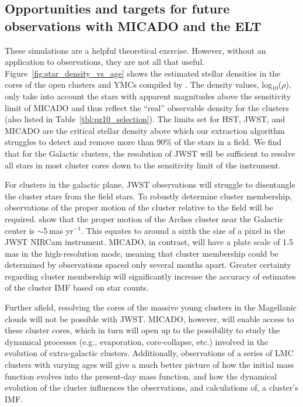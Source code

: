 \documentclass{aa}
\newcommand{\s}{$\sim$}
\newcommand{\h}[1]{$^{#1}$}
\begin{document}
\subsection{Opportunities and targets for future observations with MICADO and the ELT}
  \label{subsec:future_opportunities}

These simulations are a helpful theoretical exercise.
However, without an application to observations, they are not all that useful.
Figure~\ref{fig:star_density_vs_age} shows the estimated stellar densities in the cores of the open clusters and YMCs compiled by \citet{portegies2010}.
The density values, log$_{10}$($\rho$), only take into account the stars with apparent magnitudes above the sensitivity limit of MICADO and thus reflect the ``real'' observable density for the clusters (also listed in Table~\ref{tbl:pz10_selection}).
The limits set for HST, JWST, and MICADO are the critical stellar density above which our extraction algorithm struggles to detect and remove more than 90\% of the stars in a field.
We find that for the Galactic clusters, the resolution of JWST will be sufficient to resolve all stars in most cluster cores down to the sensitivity limit of the instrument.

For clusters in the galactic plane, JWST observations will struggle to disentangle the cluster stars from the field stars.
To robustly determine cluster membership, observations of the proper motion of the cluster relative to the field will be required.
\citet{stolte2008} show that the proper motion of the Arches cluster near the Galactic center is \s5\,mas yr\h{-1}.
This equates to around a sixth the size of a pixel in the JWST NIRCam instrument.
MICADO, in contrast, will have a plate scale of 1.5\,mas in the high-resolution mode, meaning that cluster membership could be determined by observations spaced only several months apart.
Greater certainty regarding cluster membership will significantly increase the accuracy of estimates of the cluster IMF based on star counts.

Further afield, resolving the cores of the massive young clusters in the Magellanic clouds will not be possible with JWST. MICADO, however, will enable access to these cluster cores, which in turn will open up to the possibility to study the dynamical processes (e.g., evaporation, core-collapse, etc.) involved in the evolution of extra-galactic clusters.
Additionally, observations of a series of LMC clusters with varying ages will give a much better picture of how the initial mass function evolves into the present-day mass function, and how the dynamical evolution of the cluster influences the observations, and calculations of, a cluster's IMF\@.
\end{document}
